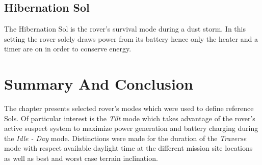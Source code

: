 
%

\subsection{Hibernation Sol}
\label{sec:ReferenceSols:HibernationSol}
The Hibernation Sol is the rover's survival mode during a dust storm. In this setting the rover solely draws power from its battery hence only the heater and a timer are on in order to conserve energy.



\section{Summary And Conclusion}
\label{sec:ReferenceSols:SummaryAndConclusion}
The chapter presents selected rover's modes which were used to define reference Sols. Of particular interest is the \textit{Tilt} mode which takes advantage of the rover's active suspect system to maximize power generation and battery charging during the \textit{Idle - Day} mode. Distinctions were made for the duration of the \textit{Traverse} mode with respect available daylight time at the different mission site locations as well as best and worst case terrain inclination.

